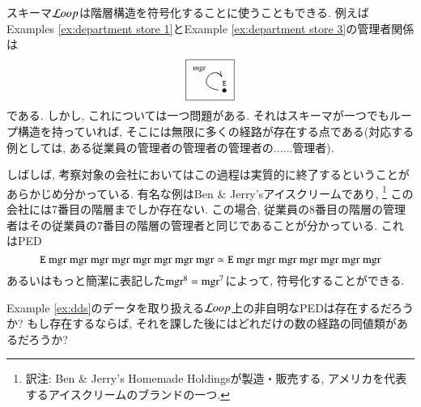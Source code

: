 \begin{example}[有限の階層]\label{ex:finite hierarchy}


スキーマ${\mathcal{L} oop}$は階層構造を符号化することに使うこともできる. 例えばExamples \ref{ex:department store 1}とExample \ref{ex:department store 3}の管理者関係は
$$\fbox{\xymatrix{\LTO{E}\ar@(l,u)[]^{\tn{mgr}}}}$$
である. しかし, これについては一つ問題がある. それはスキーマが一つでもループ構造を持っていれば, そこには無限に多くの経路が存在する点である(対応する例としては, ある従業員の管理者の管理者の管理者の......管理者).


しばしば, 考察対象の会社においてはこの過程は実質的に終了するということがあらかじめ分かっている. 有名な例はBen \& Jerry'sアイスクリームであり, \footnote{訳注: Ben \& Jerry's Homemade Holdingsが製造・販売する, アメリカを代表するアイスクリームのブランドの一つ.} この会社には7番目の階層までしか存在ない. この場合, 従業員の8番目の階層の管理者はその従業員の7番目の階層の管理者と同じであることが分かっている. これはPED$${\tt E} \tn{ mgr}\tn{ mgr}\tn{ mgr}\tn{ mgr}\tn{ mgr}\tn{ mgr}\tn{ mgr}\tn{ mgr}\simeq{\tt E}\tn{ mgr}\tn{ mgr}\tn{ mgr}\tn{ mgr}\tn{ mgr}\tn{ mgr}\tn{ mgr}$$あるいはもっと簡潔に表記した$\tn{mgr}^8=\tn{mgr}^7$によって, 符号化することができる.

\end{example}

\begin{exercise}
Example \ref{ex:dds}のデータを取り扱える${\mathcal{L} oop}$上の非自明なPEDは存在するだろうか? もし存在するならば, それを課した後にはどれだけの数の経路の同値類があるだろうか?
\end{exercise}

